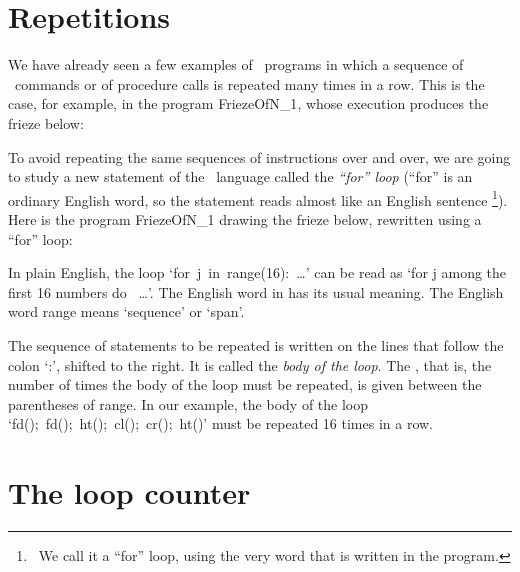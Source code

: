 \section{Repetitions}

We have already seen a few examples of \python\ programs in which a
sequence of \robot\ commands or of procedure calls is repeated
many times in a row. This is the case, for example, in the program {\idt FriezeOfN\_1}, whose execution produces the frieze below:

\vspace*{8mm}%
\noindent{}
\vspace*{-1cm}%


To avoid repeating the same sequences of in\-struc\-tions over and over,
we are going to study a new statement of the \python\ language called the
{\em ``for'' loop} (``for'' is an ordinary English word, so the statement reads almost like an English sentence%
\footnote{\ We call it a ``for'' loop, using the very word that is
written in the program.}). Here is the
program {\idt FriezeOfN\_1} drawing the frieze below,
rewritten using a ``for'' loop:

\vspace*{8mm}%
\noindent{}
\vspace*{-1cm}%
\label{prog:FriseDeN_2}


\noindent In plain English, the loop `{\mcl for}\ {\idt j}\ {\mcl in}\ {\idt range(16):}\ \ldots'
can be read as `for j among the first 16 numbers do \ \ldots'. The English word {\mcl in}
has its usual meaning. The English word {\idt range} means
`sequence' or `span'.

The sequence of statements to be repeated is written on the lines that follow the colon `{\idt :}',
shifted to the right. It is called the
{\em body of the loop}. The , that is, the
number of times the body of the loop must be repeated, is given
between the parentheses of {\idt range}. In our example, the body of the loop
`{\idt  fd();\ fd();\ ht();\ cl();\ cr();\ ht()}' must be repeated 16 times
in a row.

\section{The loop counter}

